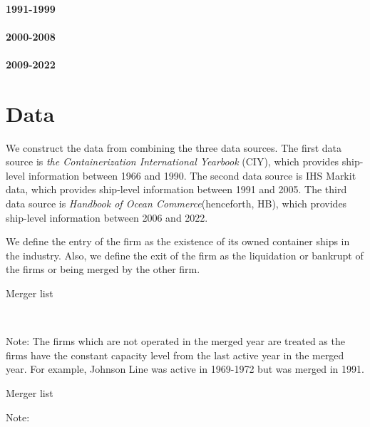 \documentclass[10pt]{article}
\begin{document}
\cite{matsuda2022unified}

\paragraph{1991-1999}

\paragraph{2000-2008}

\paragraph{2009-2022}

\section{Data}

We construct the data from combining the three data sources. 
The first data source is \textit{the Containerization International Yearbook} (CIY), which provides ship-level information between 1966 and 1990.
The second data source is IHS Markit data, which provides ship-level information between 1991 and 2005.
The third data source is \textit{Handbook of Ocean Commerce}(henceforth, HB), which provides ship-level information between 2006 and 2022.

We define the entry of the firm as the existence of its owned container ships in the industry. 
Also, we define the exit of the firm as the liquidation or bankrupt of the firms or being merged by the other firm. 

\begin{table}[!htbp]
  \begin{center}
      \caption{Merger list}
      \label{tb:merger_list_CIY} 
      \subfloat[CIY (1966-1990)]{}\\
      \subfloat[HB (2005-2022)]{}
  \end{center}\footnotesize
  Note: The firms which are not operated in the merged year are treated as the firms have the constant capacity level from the last active year in the merged year. For example, Johnson Line was active in 1969-1972 but was merged in 1991.
\end{table} 

\begin{table}[!htbp]
  \begin{center}\footnotesize
      \caption{Merger list}
      \label{tb:merger_list_IHS} 
      \subfloat[IHS (1991-2005)]{}
  \end{center}\footnotesize
  Note: 
\end{table} 
\end{document}
